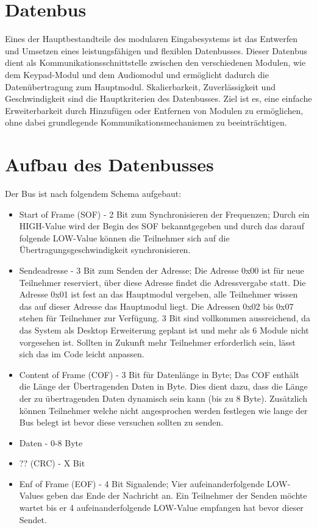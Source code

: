 \section{Datenbus}
Eines der Hauptbestandteile des modularen Eingabesystems ist das Entwerfen und Umsetzen eines leistungsfähigen und flexiblen Datenbusses. Dieser Datenbus dient als Kommunikationsschnittstelle zwischen den verschiedenen Modulen, wie dem Keypad-Modul und dem Audiomodul und ermöglicht dadurch die Datenübertragung zum Hauptmodul. Skalierbarkeit, Zuverlässigkeit und Geschwindigkeit sind die Hauptkriterien des Datenbusses. Ziel ist es, eine einfache Erweiterbarkeit durch Hinzufügen oder Entfernen von Modulen zu ermöglichen, ohne dabei grundlegende Kommunikationsmechanismen zu beeinträchtigen.

\section{Aufbau des Datenbusses}
Der Bus ist nach folgendem Schema aufgebaut:
\begin{itemize}
    \item Start of Frame (SOF) - 2 Bit zum Synchronisieren der Frequenzen; Durch ein HIGH-Value wird der Begin des SOF bekanntgegeben und durch das darauf folgende LOW-Value können die Teilnehmer sich auf die Übertragungsgeschwindigkeit synchronisieren.
    \item Sendeadresse -  3 Bit zum Senden der Adresse; Die Adresse 0x00 ist für neue Teilnehmer reserviert, über diese Adresse findet die Adressvergabe statt. Die Adresse 0x01 ist fest an das Hauptmodul vergeben, alle Teilnehmer wissen das auf dieser Adresse das Hauptmodul liegt. Die Adressen 0x02 bis 0x07 stehen für Teilnehmer zur Verfügung. 3 Bit sind vollkommen aussreichend, da das System als Desktop Erweiterung geplant ist und mehr als 6 Module nicht vorgesehen ist. Sollten in Zukunft mehr Teilnehmer erforderlich sein, lässt sich das im Code leicht anpassen.
    \item Content of Frame (COF) - 3 Bit für Datenlänge in Byte; Das COF enthält die Länge der Übertragenden Daten in Byte. Dies dient dazu, dass die Länge der zu übertragenden Daten dynamisch sein kann (bis zu 8 Byte). Zusätzlich können Teilnehmer welche nicht angesprochen werden festlegen wie lange der Bus belegt ist bevor diese versuchen sollten zu senden.
    \item Daten - 0-8 Byte
    \item ?? (CRC) - X Bit
    \item Enf of Frame (EOF) - 4 Bit Signalende; Vier aufeinanderfolgende LOW-Values geben das Ende der Nachricht an. Ein Teilnehmer der Senden möchte wartet bis er 4 aufeinanderfolgende LOW-Value empfangen hat bevor dieser Sendet.
\end{itemize}

